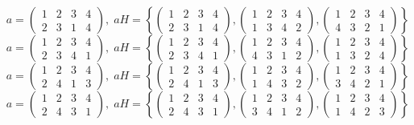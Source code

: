 \documentclass[a4paper,12pt]{article}
\begin{document}
\begin{itemize}
\[a = \begin{pmatrix} 1 & 2 & 3 & 4 \\ 2&3&1&4\end{pmatrix}, \; aH = \left\{\begin{pmatrix} 1 & 2 & 3 & 4 \\ 2&3&1&4\end{pmatrix}, \begin{pmatrix} 1 & 2 & 3 & 4 \\ 1&3&4&2\end{pmatrix}, \begin{pmatrix} 1 & 2 & 3 & 4 \\ 4&3&2&1\end{pmatrix} \right\}\]
\[a = \begin{pmatrix} 1 & 2 & 3 & 4 \\ 2&3&4&1\end{pmatrix}, \; aH = \left\{\begin{pmatrix} 1 & 2 & 3 & 4 \\ 2&3&4&1\end{pmatrix}, \begin{pmatrix} 1 & 2 & 3 & 4 \\ 4&3&1&2\end{pmatrix}, \begin{pmatrix} 1 & 2 & 3 & 4 \\ 1&3&2&4\end{pmatrix} \right\}\]
\[a = \begin{pmatrix} 1 & 2 & 3 & 4 \\ 2&4&1&3\end{pmatrix}, \; aH = \left\{\begin{pmatrix} 1 & 2 & 3 & 4 \\ 2&4&1&3\end{pmatrix}, \begin{pmatrix} 1 & 2 & 3 & 4 \\ 1&4&3&2\end{pmatrix}, \begin{pmatrix} 1 & 2 & 3 & 4 \\ 3&4&2&1\end{pmatrix} \right\}\]
\[a = \begin{pmatrix} 1 & 2 & 3 & 4 \\ 2&4&3&1\end{pmatrix}, \; aH = \left\{\begin{pmatrix} 1 & 2 & 3 & 4 \\ 2&4&3&1\end{pmatrix}, \begin{pmatrix} 1 & 2 & 3 & 4 \\ 3&4&1&2\end{pmatrix}, \begin{pmatrix} 1 & 2 & 3 & 4 \\ 1&4&2&3\end{pmatrix} \right\}\]

\end{itemize}
\end{document}
